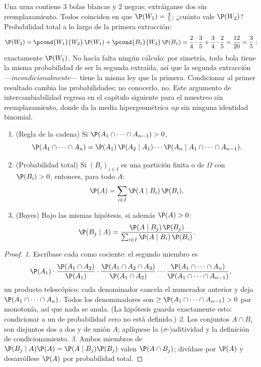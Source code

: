 \begin{example}\label{ex:b2:proba:seconddraw}
Una urna contiene $3$ bolas blancas y $2$ negras; extráiganse dos sin
reemplazamiento. Todos coinciden en que $\P(W_1) = \frac35$; ¿cuánto
vale $\P(W_2)$? Probabilidad total a lo largo de la primera
extracción:
\[
\P(W_2) = \pcond{W_1}{W_2}\,\P(W_1) +
\pcond{B_1}{W_2}\,\P(B_1)
= \frac24\cdot\frac35 + \frac34\cdot\frac25
= \frac{12}{20} = \frac35 :
\]
exactamente $\P(W_1)$. No hacía falta ningún cálculo: por simetría,
toda bola tiene la misma probabilidad de ser la segunda extraída, así
que la segunda extracción ---\emph{incondicionalmente}--- tiene la
misma ley que la primera. Condicionar al primer resultado cambia las
probabilidades; no conocerlo, no. Este argumento de
intercambiabilidad regresa en el capítulo siguiente para el muestreo
sin reemplazamiento, donde da la media hipergeométrica $np$ sin
ninguna identidad binomial.
\end{example}

\begin{theorem}\label{thm:b2:proba:bayes}
\leavevmode
\begin{enumerate}
\item (Regla de la cadena) Si $\P(A_1 \cap \dots \cap A_{n-1}) > 0$,
\[
\P(A_1 \cap \dots \cap A_n)
= \P(A_1)\,\P(A_2 \mid A_1)\cdots
\P(A_n \mid A_1 \cap \dots \cap A_{n-1}) .
\]
\item (Probabilidad total) Si $(B_i)_{i \in I}$ es una partición
finita o  de $\Omega$ con $\P(B_i) > 0$, entonces, para
todo  $A$:
\[
\P(A) = \sum_{i \in I} \P(A \mid B_i)\,\P(B_i) .
\]
\item (Bayes) Bajo las mismas hipótesis, si además $\P(A) > 0$:
\[
\P(B_j \mid A)
= \frac{\P(A \mid B_j)\,\P(B_j)}
       {\sum_{i \in I} \P(A \mid B_i)\,\P(B_i)} .
\]
\end{enumerate}
\end{theorem}

\begin{proof}
\emph{1.} Escríbase cada  como cociente: el
segundo miembro es
\[
\P(A_1)\cdot\frac{\P(A_1 \cap A_2)}{\P(A_1)}\cdot
\frac{\P(A_1 \cap A_2 \cap A_3)}{\P(A_1 \cap A_2)}\cdots
\frac{\P(A_1 \cap \dots \cap A_n)}{\P(A_1 \cap \dots \cap
A_{n-1})},
\]
un producto telescópico: cada denominador cancela el numerador
anterior y deja $\P(A_1 \cap \dots \cap A_n)$. Todos los
denominadores son $\geq \P(A_1 \cap \dots \cap A_{n-1}) > 0$ por
monotonía, así que nada se anula. (La hipótesis guarda exactamente
esto: condicionar a un  de probabilidad cero no está
definido.) \emph{2.} Los conjuntos $A \cap B_i$ son disjuntos dos a
dos y de unión $A$; aplíquese la ($\sigma$-)aditividad y la
definición de condicionamiento. \emph{3.} Ambos miembros de $\P(B_j
\mid A)\P(A) = \P(A \mid B_j)\P(B_j)$ valen $\P(A \cap B_j)$;
divídase por $\P(A)$ y desarróllese $\P(A)$ por probabilidad total.
\end{proof}

